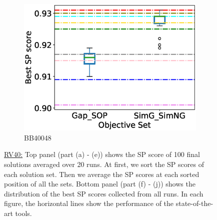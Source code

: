 \begin{figure}[!htbp]
\begin{adjustwidth}{-1cm}{-1cm}
\begin{subfigure}{0.22\textwidth}
			\includegraphics[width=\columnwidth]{Figure/summary/precomputedInit/Balibase/BB40048_objset_pairs_rank_2}
			\caption{BB40048}
		\end{subfigure}
		\caption{\underline{RV40:} Top panel (part (a) - (e)) shows the SP score of 100 final solutions averaged over 20 runs. At first, we sort the SP scores of each solution set. Then we average the SP scores at each sorted position of all the sets. Bottom panel (part (f) - (j)) shows the distribution of the best SP scores collected from all runs. In each figure, the horizontal lines show the performance of the state-of-the-art tools.}
		\label{fig:rv40_sp}
	\end{adjustwidth}
\end{figure}

